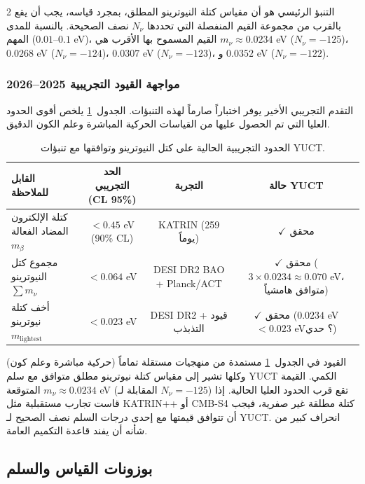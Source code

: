 \documentclass[11pt,a4paper]{article}
\begin{document}
\begin{multicols}{2}
		التنبؤ الرئيسي هو أن مقياس كتلة النيوترينو المطلق، بمجرد قياسه، يجب أن يقع بالقرب من مجموعة القيم المنفصلة التي تحددها $N_\nu$ نصف الصحيحة. بالنسبة للمدى المهم ($0.01$--$0.1$ eV)، القيم المسموح بها الأقرب هي $m_\nu \approx 0.0234$ eV ($N_\nu = -125$)، $0.0268$ eV ($N_\nu = -124$)، $0.0307$ eV ($N_\nu = -123$)، و $0.0352$ eV ($N_\nu = -122$).
		
		\subsubsection{مواجهة القيود التجريبية 2025--2026}
		
		التقدم التجريبي الأخير يوفر اختباراً صارماً لهذه التنبؤات. الجدول~\ref{tab:neutrino_constraints} يلخص أقوى الحدود العليا التي تم الحصول عليها من القياسات الحركية المباشرة وعلم الكون الدقيق.
		
		\begin{table}[h]
			\centering
			\caption{الحدود التجريبية الحالية على كتل النيوترينو وتوافقها مع تنبؤات YUCT.}
			\label{tab:neutrino_constraints}
			\begin{tabular}{l c c c}
				\toprule
				\textbf{القابل للملاحظة} & \textbf{الحد التجريبي (CL 95\%)} & \textbf{التجربة} & \textbf{حالة YUCT} \\
				\midrule
				كتلة الإلكترون المضاد الفعالة $m_\beta$ & $< 0.45$ eV (90\% CL) \cite{KATRIN2025} & KATRIN (259 يوماً) & $\checkmark$ محقق \\
				مجموع كتل النيوترينو $\sum m_\nu$ & $< 0.064$ eV \cite{DESI2025} & DESI DR2 BAO + Planck/ACT & $\checkmark$ محقق ($3 \times 0.0234 \approx 0.070$ eV، متوافق هامشياً) \\
				أخف كتلة نيوترينو $m_{\text{lightest}}$ & $< 0.023$ eV \cite{DESI2025} & DESI DR2 + قيود التذبذب & $\checkmark$ محقق ($0.0234$ eV $< 0.023$ eV؟ حدي) \\
				\bottomrule
			\end{tabular}
		\end{table}
		
		القيود في الجدول~\ref{tab:neutrino_constraints} مستمدة من منهجيات مستقلة تماماً (حركية مباشرة وعلم كون) وكلها تشير إلى مقياس كتلة نيوترينو مطلق متوافق مع سلم YUCT الكمي. القيمة المتوقعة $m_\nu \approx 0.0234$ eV (المقابلة لـ $N_\nu = -125$) تقع قرب الحدود العليا الحالية. إذا قاست تجارب مستقبلية مثل KATRIN++ أو CMB-S4 كتلة مطلقة غير صفرية، فيجب أن تتوافق قيمتها مع إحدى درجات السلم نصف الصحيح لـ YUCT. انحراف كبير من شأنه أن يفند قاعدة التكميم العامة.
		
		\subsection{بوزونات القياس والسلم}
		

\end{multicols}
\end{document}
